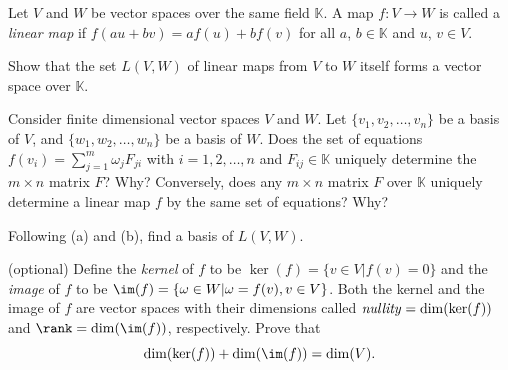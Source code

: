 \begin{problem}
  Let $V$ and $W$ be vector spaces over the same field $\mathbb K$.
  A map $f: V \to W$ is called a \emph{linear map} if $f(au + bv) = af(u) + bf(v)$
  for all $a$, $b \in \mathbb K$ and $u$, $v \in V$.
  \begin{enumext*}[label = (\alph*)]
    \item Show that the set $L(V,W)$ of linear maps from $V$ to $W$ itself forms a vector space over $\mathbb K$.
    \item Consider finite dimensional vector spaces $V$ and $W$.
    Let $\{v_1, v_2, \ldots, v_n\}$ be a basis of $V$, and
    $\{w_1, w_2, \ldots, w_n\}$ be a basis of $W$.
    Does the set of equations $f(v_i) = \sum_{j=1}^m \omega_j F_{ji}$
    with $i = 1, 2, \ldots, n$ and $F_{ij} \in \mathbb K$ uniquely determine
    the $m \times n$ matrix $F$? Why? Conversely, does any $m \times n$ matrix $F$
    over $\mathbb K$ uniquely determine a linear map $f$ by the same set of equations? Why?
    \item Following (a) and (b), find a basis of $L(V, W)$.
    \item* (optional) Define the \emph{kernel} of $f$ to be
    $\ker(f) = \{v \in V | f(v) = 0\}$ and the \emph{image} of $f$ to be
    $\im(f) = \{\omega \in W | \omega = f(v), v \in V\}$.
    Both the kernel and the image of $f$ are vector spaces with their dimensions
    called $\text{\emph{nullity}} = \dim(\ker(f))$ and $\rank = \dim(\im(f))$, respectively.
    Prove that
    \[
      \dim(\ker(f)) + \dim(\im(f)) = \dim(V).
    \]
  \end{enumext*}
\end{problem}
